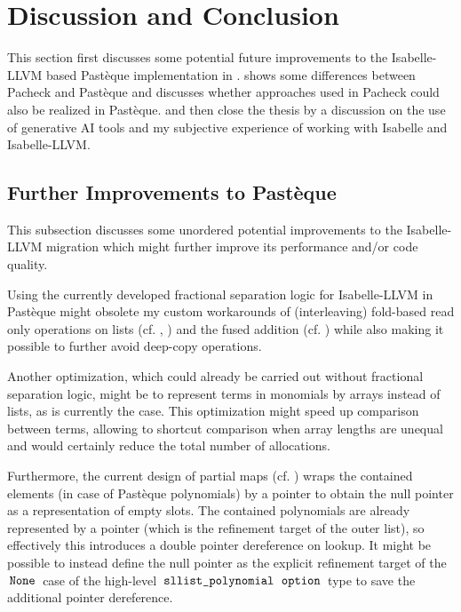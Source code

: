 \section{Discussion and Conclusion}\label{sec:discussion}

This section first discusses some potential future improvements to the Isabelle-LLVM based Pastèque implementation in .
 shows some differences between Pacheck and Pastèque and discusses whether approaches used in Pacheck could also be realized in Pastèque.
 and  then close the thesis by a discussion on the use of generative AI tools and my subjective experience of working with Isabelle and Isabelle-LLVM.

\subsection{Further Improvements to Pastèque}\label{sec:future-development}
This subsection discusses some unordered potential improvements to the Isabelle-LLVM migration which might further improve its performance and/or code quality.

Using the currently developed fractional separation logic for Isabelle-LLVM \cite{isabelle-llvm-fractional} in Pastèque might obsolete my custom workarounds of (interleaving) fold-based read only operations on lists (cf. , ) and the fused addition (cf. ) while also making it possible to further avoid deep-copy operations.

Another optimization, which could already be carried out without fractional separation logic, might be to represent terms in monomials by arrays instead of lists, as is currently the case.
This optimization might speed up comparison between terms, allowing to shortcut comparison when array lengths are unequal and would certainly reduce the total number of allocations.

Furthermore, the current design of partial maps (cf. ) wraps the contained elements (in case of Pastèque polynomials) by a pointer to obtain the null pointer as a representation of empty slots.
The contained polynomials are already represented by a pointer (which is the refinement target of the outer list), so effectively this introduces a double pointer dereference on lookup.
It might be possible to instead define the null pointer as the explicit refinement target of the $\,\text{\ttfamily None}\,$ case of the high-level $\,\text{\ttfamily sllist\_polynomial}\, \; \,\text{\ttfamily option}\,$ type to save the additional pointer dereference.

